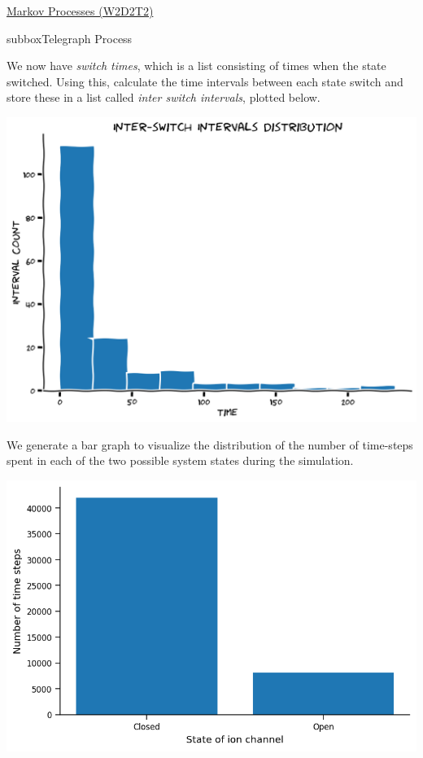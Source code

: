 \begin{textbox}{\href{https://colab.research.google.com/github/NeuromatchAcademy/course-content/blob/master/tutorials/W2D2_LinearSystems/student/W2D2_Tutorial2.ipynb}{Markov Processes (W2D2T2)} }
\begin{subbox}{subbox}{Telegraph Process}
\scriptsize

We now have \textit{switch times}, which is a list consisting of times when the state switched. Using this, calculate the time intervals between each state switch and store these in a list called \textit{inter switch intervals}, plotted below.

\begin{center}
    
\includegraphics[scale=0.2]{Figures/LS/MC_Figure2.png}
\end{center}

We generate a bar graph to visualize the distribution of the number of time-steps spent in each of the two possible system states during the simulation.
\begin{center}
\includegraphics[scale=0.25]{Figures/LS/MC_Figure3.png}
\end{center}


\end{subbox}
\end{textbox}
